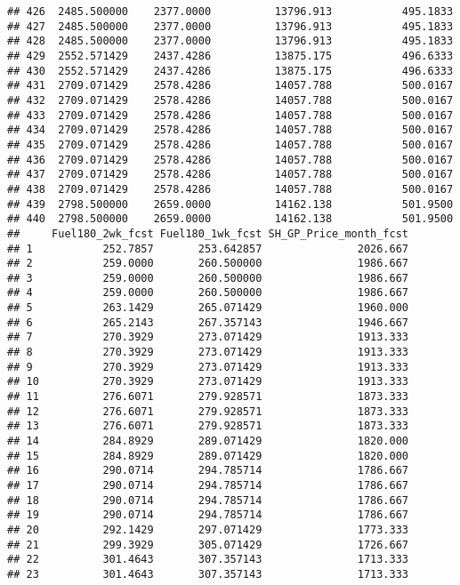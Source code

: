 \documentclass[]{article}
\begin{document}
\begin{verbatim}
## 426  2485.500000    2377.0000          13796.913           495.1833
## 427  2485.500000    2377.0000          13796.913           495.1833
## 428  2485.500000    2377.0000          13796.913           495.1833
## 429  2552.571429    2437.4286          13875.175           496.6333
## 430  2552.571429    2437.4286          13875.175           496.6333
## 431  2709.071429    2578.4286          14057.788           500.0167
## 432  2709.071429    2578.4286          14057.788           500.0167
## 433  2709.071429    2578.4286          14057.788           500.0167
## 434  2709.071429    2578.4286          14057.788           500.0167
## 435  2709.071429    2578.4286          14057.788           500.0167
## 436  2709.071429    2578.4286          14057.788           500.0167
## 437  2709.071429    2578.4286          14057.788           500.0167
## 438  2709.071429    2578.4286          14057.788           500.0167
## 439  2798.500000    2659.0000          14162.138           501.9500
## 440  2798.500000    2659.0000          14162.138           501.9500
##     Fuel180_2wk_fcst Fuel180_1wk_fcst SH_GP_Price_month_fcst
## 1           252.7857       253.642857               2026.667
## 2           259.0000       260.500000               1986.667
## 3           259.0000       260.500000               1986.667
## 4           259.0000       260.500000               1986.667
## 5           263.1429       265.071429               1960.000
## 6           265.2143       267.357143               1946.667
## 7           270.3929       273.071429               1913.333
## 8           270.3929       273.071429               1913.333
## 9           270.3929       273.071429               1913.333
## 10          270.3929       273.071429               1913.333
## 11          276.6071       279.928571               1873.333
## 12          276.6071       279.928571               1873.333
## 13          276.6071       279.928571               1873.333
## 14          284.8929       289.071429               1820.000
## 15          284.8929       289.071429               1820.000
## 16          290.0714       294.785714               1786.667
## 17          290.0714       294.785714               1786.667
## 18          290.0714       294.785714               1786.667
## 19          290.0714       294.785714               1786.667
## 20          292.1429       297.071429               1773.333
## 21          299.3929       305.071429               1726.667
## 22          301.4643       307.357143               1713.333
## 23          301.4643       307.357143               1713.333

\end{verbatim}
\end{document}
